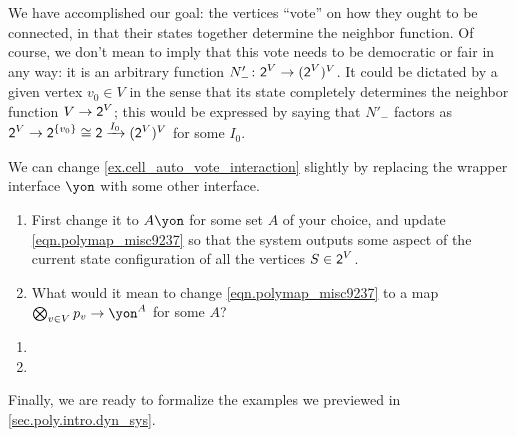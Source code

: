 \documentclass[Book-Poly]{subfiles}
\begin{document}
\begin{example}
We have accomplished our goal: the vertices ``vote'' on how they ought to be connected, in that their states together determine the neighbor function.
Of course, we don't mean to imply that this vote needs to be democratic or fair in any way: it is an arbitrary function $N'_-\colon \textsf{2}^V\to(\textsf{2}^V)^V$.
It could be dictated by a given vertex $v_0\in V$ in the sense that its state completely determines the neighbor function $V\to\textsf{2}^V$; this would be expressed by saying that $N'_-$ factors as $\textsf{2}^V\to\textsf{2}^{\{v_0\}}\cong\textsf{2}\xrightarrow{I_0}(\textsf{2}^V)^V$ for some $I_0$.
\end{example}

\begin{exercise}
We can change \cref{ex.cell_auto_vote_interaction} slightly by replacing the wrapper interface $\yon$ with some other interface.
\begin{enumerate}
	\item First change it to $A\yon$ for some set $A$ of your choice, and update \eqref{eqn.polymap_misc9237} so that the system outputs some aspect of the current state configuration of all the vertices $S\in\textsf{2}^V$.
	\item What would it mean to change \eqref{eqn.polymap_misc9237} to a map $\bigotimes_{v\in V}p_v\to\yon^A$ for some $A$?
\qedhere
\end{enumerate}
\begin{solution}
\begin{enumerate}
    \item 
    \item 
\end{enumerate}
\end{solution}
\end{exercise}

Finally, we are ready to formalize the examples we previewed in \cref{sec.poly.intro.dyn_sys}.
\end{document}
